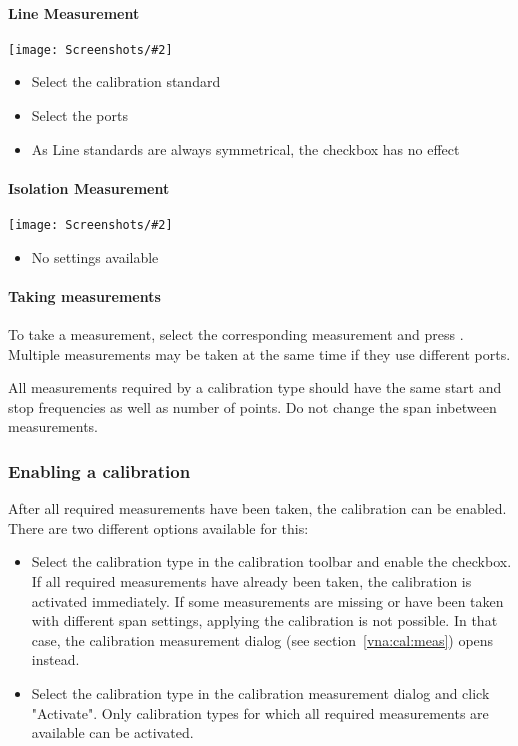 \documentclass[a4paper,11pt]{article}
\newcommand\info[1][5ex]{%
  \renewcommand\stacktype{L}%
  \scaleto{\stackon[1.2pt]{\color{blue}$\bigcirc$}{\raisebox{-1.5pt}{\small i}}}{#1}%
}
\newenvironment{information}[1][]{%
   \begin{mdframed}[%
      backgroundcolor={blue!15}, hidealllines=true,
      skipabove=0.7\baselineskip, skipbelow=0.7\baselineskip,
      splitbottomskip=2pt, splittopskip=4pt, #1]%
   \makebox[0pt]{%
      \smash{%
         \hspace*{-45pt}%
         \raisebox{-5pt}{%
            {\info}%
         }%
      }%
   }%
}{\end{mdframed}}
\newcommand{\screenshot}[2]{\begin{center}
\texttt{[image: Screenshots/\#2]}
\end{center}}
\begin{document}
\paragraph{Line Measurement}
\screenshot{1.0}{LineMeasurement.png}
\begin{itemize}
\item Select the calibration standard
\item Select the ports
\item As Line standards are always symmetrical, the checkbox has no effect
\end{itemize}

\paragraph{Isolation Measurement}
\screenshot{1.0}{IsolationMeasurement.png}
\begin{itemize}
\item No settings available
\end{itemize}

\paragraph{Taking measurements}
To take a measurement, select the corresponding measurement and press . Multiple measurements may be taken at the same time if they use different ports.
\begin{information}
All measurements required by a calibration type should have the same start and stop frequencies as well as number of points. Do not change the span inbetween measurements.
\end{information}

\subsubsection{Enabling a calibration}
After all required measurements have been taken, the calibration can be enabled. There are two different options available for this:
\begin{itemize}
\item Select the calibration type in the calibration toolbar and enable the checkbox. If all required measurements have already been taken, the calibration is activated immediately. If some measurements are missing or have been taken with different span settings, applying the calibration is not possible. In that case, the calibration measurement dialog (see section~\ref{vna:cal:meas}) opens instead.
\item Select the calibration type in the calibration measurement dialog and click "Activate". Only calibration types for which all required measurements are available can be activated.
\end{itemize}
\end{document}
